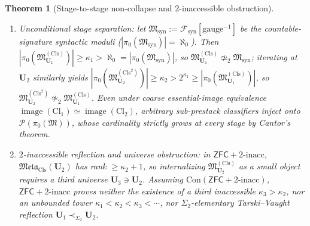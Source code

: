 \documentclass[11pt]{article}
\theoremstyle{plain}
\newtheorem{theorem}{Theorem}[section]
\theoremstyle{definition}
\newcommand{\cF}{\mathcal{F}}
\newcommand{\fM}{\mathfrak{M}}
\newcommand{\Meta}{\mathfrak{Meta}}
\newcommand{\Cl}{\mathrm{Cl}}
\newcommand{\Con}{\mathrm{Con}}
\newcommand{\ZFC}{\mathsf{ZFC}}
\DeclareMathOperator{\image}{image}
\begin{document}
\begin{theorem}[Stage-to-stage non-collapse and $2$-inaccessible obstruction]\label{thm:meta-nonidempotence-obstruction}
\begin{enumerate}[nosep,label=(\roman*)]
\item \emph{Unconditional stage separation}: let $\fM_{\mathrm{syn}} := \cF_{\mathrm{syn}}[\mathrm{gauge}^{-1}]$ be the countable-signature syntactic moduli ($|\pi_0(\fM_{\mathrm{syn}})| = \aleph_0$). Then $|\pi_0(\fM^{(\mathrm{Cls})}_{\mathbf{U}_1})| \ge \kappa_1 > \aleph_0 = |\pi_0(\fM_{\mathrm{syn}})|$, so $\fM^{(\mathrm{Cls})}_{\mathbf{U}_1} \not\simeq_2 \fM_{\mathrm{syn}}$; iterating at $\mathbf{U}_2$ similarly yields $|\pi_0(\fM^{(\mathrm{Cls}^2)}_{\mathbf{U}_2})| \ge \kappa_2 > 2^{\kappa_1} \ge |\pi_0(\fM^{(\mathrm{Cls})}_{\mathbf{U}_1})|$, so $\fM^{(\mathrm{Cls}^2)}_{\mathbf{U}_2} \not\simeq_2 \fM^{(\mathrm{Cls})}_{\mathbf{U}_1}$. Even under coarse essential-image equivalence $\image(\Cl_1) \simeq \image(\Cl_2)$, arbitrary sub-prestack classifiers inject onto $\mathcal{P}(\pi_0(\fM))$, whose cardinality strictly grows at every stage by Cantor's theorem.
\item \emph{$2$-inaccessible reflection and universe obstruction}: in $\ZFC + 2\text{-inacc}$, $\Meta_{\mathrm{Cls}}(\mathbf{U}_2)$ has rank $\ge \kappa_2 + 1$, so internalizing $\fM^{(\mathrm{Cls})}_{\mathbf{U}_2}$ as a small object requires a third universe $\mathbf{U}_3 \ni \mathbf{U}_2$. Assuming $\Con(\ZFC + 2\text{-inacc})$, $\ZFC + 2\text{-inacc}$ proves neither the existence of a third inaccessible $\kappa_3 > \kappa_2$, nor an unbounded tower $\kappa_1 < \kappa_2 < \kappa_3 < \cdots$, nor $\Sigma_2$-elementary Tarski--Vaught reflection $\mathbf{U}_1 \prec_{\Sigma_2} \mathbf{U}_2$.
\end{enumerate}
\end{theorem}
\end{document}
